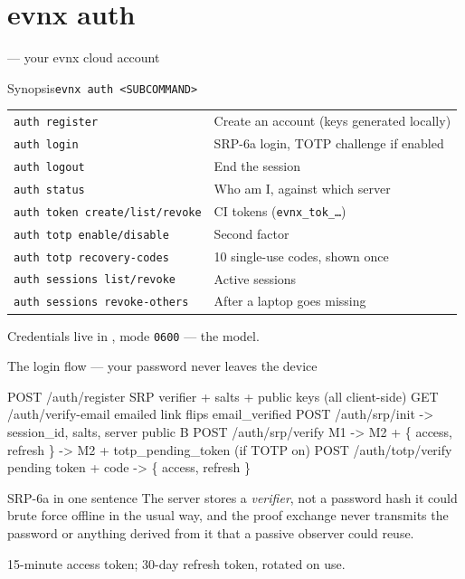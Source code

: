\section{evnx auth}

\begin{frame}{ — your evnx cloud account}
  \begin{block}{Synopsis}\texttt{evnx auth <SUBCOMMAND>}\end{block}

  \begin{tabular}{@{}ll@{}}
    \toprule
    \texttt{auth register} & Create an account (keys generated locally) \\
    \texttt{auth login}    & SRP-6a login, TOTP challenge if enabled \\
    \texttt{auth logout}   & End the session \\
    \texttt{auth status}   & Who am I, against which server \\
    \midrule
    \texttt{auth token create/list/revoke} & CI tokens (\texttt{evnx\_tok\_\ldots}) \\
    \texttt{auth totp enable/disable}      & Second factor \\
    \texttt{auth totp recovery-codes}      & 10 single-use codes, shown once \\
    \texttt{auth sessions list/revoke}     & Active sessions \\
    \texttt{auth sessions revoke-others}   & After a laptop goes missing \\
    \bottomrule
  \end{tabular}

  \vspace{0.5em}
  {\footnotesize Credentials live in ,
  mode \texttt{0600} — the  model.}
\end{frame}

\begin{frame}[fragile]{The login flow — your password never leaves the device}
\begin{semiverbatim}\scriptsize
POST /auth/register    SRP verifier + salts + public keys (all client-side)
GET  /auth/verify-email   emailed link flips email_verified
POST /auth/srp/init    -> session_id, salts, server public B
POST /auth/srp/verify  M1 -> M2 + \{ access, refresh \}
                          -> M2 + totp_pending_token   (if TOTP on)
POST /auth/totp/verify pending token + code -> \{ access, refresh \}
\end{semiverbatim}

  \vspace{0.4em}
  \begin{block}{SRP-6a in one sentence}
    The server stores a \emph{verifier}, not a password hash it could brute
    force offline in the usual way, and the proof exchange never transmits the
    password or anything derived from it that a passive observer could reuse.
  \end{block}

  {\footnotesize 15-minute access token; 30-day refresh token, rotated on use.}
\end{frame}

